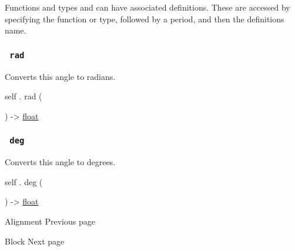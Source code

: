 \label{definitions-tooltip}
Functions and types and can have associated definitions. These are
accessed by specifying the function or type, followed by a period, and
then the definition\textquotesingle s name.

\subsubsection{\texorpdfstring{\texttt{\ rad\ }}{ rad }}\label{definitions-rad}

Converts this angle to radians.

self { . } { rad } (

) -\textgreater{} \href{/docs/reference/foundations/float/}{float}

\subsubsection{\texorpdfstring{\texttt{\ deg\ }}{ deg }}\label{definitions-deg}

Converts this angle to degrees.

self { . } { deg } (

) -\textgreater{} \href{/docs/reference/foundations/float/}{float}

\href{/docs/reference/layout/alignment/}{\pandocbounded{}}

{ Alignment } { Previous page }

\href{/docs/reference/layout/block/}{\pandocbounded{}}

{ Block } { Next page }
